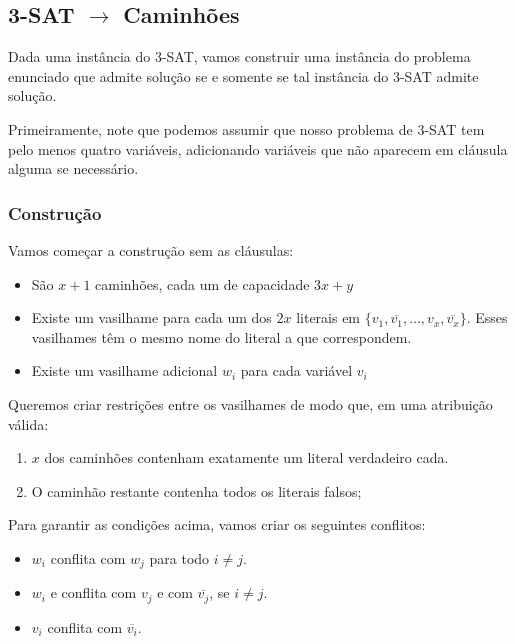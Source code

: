 \documentclass[11pt]{article}
\begin{document}
\subsection{3-SAT $\to$ Caminhões}
\label{sec-3-2}

Dada uma instância do 3-SAT, vamos construir uma instância do problema
enunciado que admite solução se e somente se tal
instância do 3-SAT admite solução.

Primeiramente, note que podemos assumir que nosso
problema de 3-SAT tem pelo menos quatro variáveis, adicionando
variáveis que não aparecem em cláusula alguma se necessário.

\subsubsection{Construção}
\label{sec-3-2-1}

Vamos começar a construção sem as cláusulas:

\begin{itemize}
\item São $x+1$ caminhões, cada um de capacidade $3x+y$

\item Existe um vasilhame para cada um dos $2x$ literais em $\{v_1,
  \overline{v_1}, \ldots, v_x, \overline{v_x}\}$. Esses vasilhames têm o
mesmo nome do literal a que correspondem.

\item Existe um vasilhame adicional $w_i$ para cada variável $v_i$
\end{itemize}

Queremos criar restrições entre os vasilhames de modo que, em uma
atribuição válida:

\begin{enumerate}
\item $x$ dos caminhões contenham exatamente um literal verdadeiro cada.
\item O caminhão restante contenha todos os literais falsos;
\end{enumerate}

Para garantir as condições acima, vamos criar os seguintes conflitos:
\begin{itemize}
\item $w_i$ conflita com $w_j$ para todo $i \neq j$.
\item $w_i$ e conflita com $v_j$ e com $\overline{v_j}$, se $i \neq j$.
\item $v_i$ conflita com $\overline{v_i}$.
\end{itemize}
\end{document}
